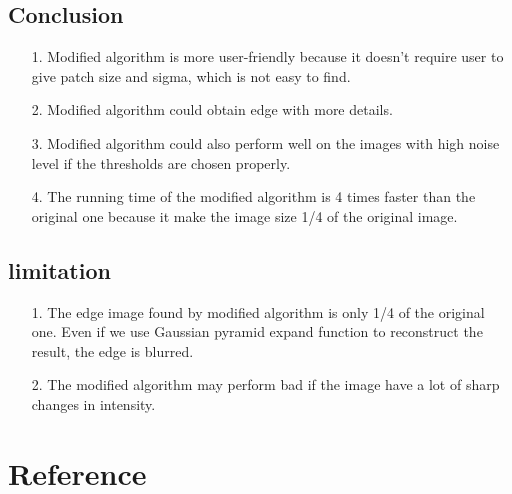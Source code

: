 \documentclass[10pt,twocolumn,letterpaper]{article}
\begin{document}
\subsection{Conclusion}
\begin{enumerate}
	\item[1.] Modified algorithm is more user-friendly because it doesn't require user to give patch size and sigma, which is not easy to find.
	\item[2.] Modified algorithm could obtain edge with more details.
	\item[3.] Modified algorithm could also perform well on the images with high noise level if the thresholds are chosen properly.
	\item[4.] The running time of the modified algorithm is 4 times faster than the original one because it make the image size 1/4 of the original image.
\end{enumerate}
\subsection{limitation}
\begin{enumerate}
	\item[1.] The edge image found by modified algorithm is only 1/4 of the original one. Even if we use Gaussian pyramid expand function to reconstruct the result, the edge is blurred.
	\item[2.] The modified algorithm may perform bad if the image have a lot of sharp changes in intensity. 
\end{enumerate}

\section{Reference}
\end{document}
